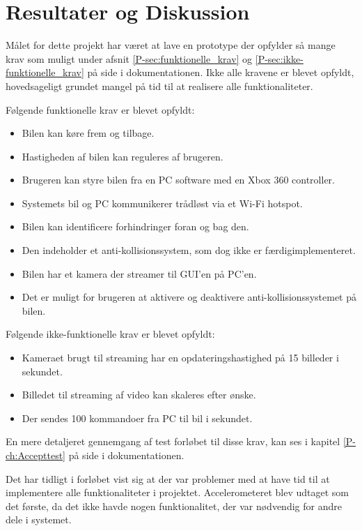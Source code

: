 \chapter{Resultater og Diskussion} \label{ch:Resultater_og_diskussion}

Målet for dette projekt har været at lave en prototype der opfylder så mange krav som muligt under afsnit \ref{P-sec:funktionelle_krav}  og \ref{P-sec:ikke-funktionelle_krav}  på side \pageref{P-sec:funktionelle_krav} i dokumentationen. 
Ikke alle kravene er blevet opfyldt, hovedsageligt grundet mangel på tid til at realisere alle funktionaliteter.

Følgende funktionelle krav er blevet opfyldt:
\begin{itemize}
	\item Bilen kan køre frem og tilbage. 
	\item Hastigheden af bilen kan reguleres af brugeren. 
	\item Brugeren kan styre bilen fra en PC software med en Xbox 360 controller. 			\item Systemets bil og PC kommunikerer trådløst via et Wi-Fi hotspot.
	\item Bilen kan identificere forhindringer foran og bag den. 
	\item Den indeholder et anti-kollisionssystem, som dog ikke er færdigimplementeret. 
	\item Bilen har et kamera der streamer til GUI'en på PC'en. 
	\item Det er muligt for brugeren at aktivere og deaktivere anti-kollisionssystemet på bilen.
\end{itemize}

Følgende ikke-funktionelle krav er blevet opfyldt: 
\begin{itemize}
	\item Kameraet brugt til streaming har en opdateringshastighed på 15 billeder i sekundet. 
	\item Billedet til streaming af video kan skaleres efter ønske. 
	\item Der sendes 100 kommandoer fra PC til bil i sekundet.
\end{itemize}

En mere detaljeret gennemgang af test forløbet til disse krav, kan ses i kapitel \ref{P-ch:Accepttest}  på side \pageref{P-ch:Accepttest} i dokumentationen.

Det har tidligt i forløbet vist sig at der var problemer med at have tid til at implementere alle funktionaliteter i projektet. Accelerometeret blev udtaget som det første, da det ikke havde nogen funktionalitet, der var nødvendig for andre dele i systemet.

